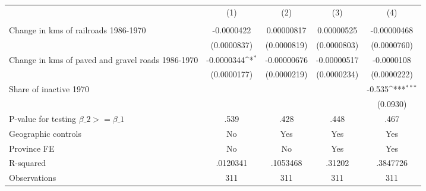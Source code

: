 {
\def\sym#1{\ifmmode^{#1}\else\(^{#1}\)\fi}
\begin{tabular}{l*{4}{c}}
\hline\hline
                &\multicolumn{1}{c}{(1)}&\multicolumn{1}{c}{(2)}&\multicolumn{1}{c}{(3)}&\multicolumn{1}{c}{(4)}\\
                &\multicolumn{1}{c}{}&\multicolumn{1}{c}{}&\multicolumn{1}{c}{}&\multicolumn{1}{c}{}\\
\hline
Change in kms of railroads 1986-1970&-0.0000422         &0.00000817         &0.00000525         &-0.00000468         \\
                &(0.0000837)         &(0.0000819)         &(0.0000803)         &(0.0000760)         \\
[1em]
Change in kms of paved and gravel roads 1986-1970&-0.0000344\sym{*}  &-0.00000676         &-0.00000517         &-0.0000108         \\
                &(0.0000177)         &(0.0000219)         &(0.0000234)         &(0.0000222)         \\
[1em]
Share of inactive 1970&                  &                  &                  &   -0.535\sym{***}\\
                &                  &                  &                  & (0.0930)         \\
\hline
P-value for testing $\beta\_{2} >= \beta\_{1}$&     .539         &     .428         &     .448         &     .467         \\
Geographic controls&       No         &      Yes         &      Yes         &      Yes         \\
Province FE     &       No         &       No         &      Yes         &      Yes         \\
R-squared       & .0120341         & .1053468         &   .31202         & .3847726         \\
Observations    &      311         &      311         &      311         &      311         \\
\hline\hline
\end{tabular}
}
